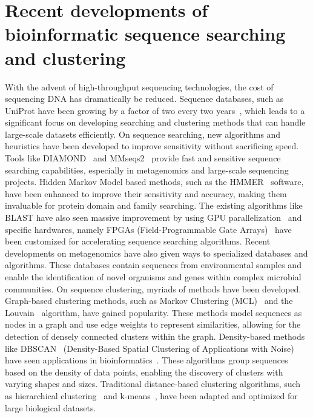 \documentclass[twoside,a4paper,bsc]{master}
\begin{document}
\section{Recent developments of bioinformatic sequence searching and
clustering}
With the advent of high-throughput sequencing technologies, the cost of
sequencing DNA has dramatically be reduced. Sequence databases, such as
UniProt have been growing by a factor of two every two
years~\cite{apweiler2004uniprot}, which leads to a significant focus on
developing searching and clustering methods that can handle large-scale
datasets
efficiently.
On sequence searching, new algorithms and heuristics have been developed to
improve sensitivity without sacrificing speed. Tools like
DIAMOND~\cite{buchfink2015fast,BUC:REU:DRO:2021} and
MMseqs2~\cite{steinegger2017mmseqs2} provide fast and sensitive sequence
searching capabilities,
especially in metagenomics and large-scale sequencing projects.
Hidden
Markov Model based
methods, such as the HMMER~\cite{finn2011hmmer} software, have been
enhanced to improve their
sensitivity and accuracy, making them invaluable for protein domain and
family searching. The existing algorithms like BLAST have also seen massive
improvement by using GPU parallelization~\cite{vouzis2011gpu} and specific
hardwares, namely
FPGAs (Field-Programmable Gate Arrays)~\cite{guo2012systolic} have been
customized for
accelerating sequence searching algorithms.
Recent developments on metagenomics have also given ways to specialized
databases and algorithms. These databases contain sequences from
environmental samples and enable the identification of novel organisms and
genes within complex microbial communities.
On sequence clustering, myriads of methods have been developed. Graph-based
clustering methods, such as Markov Clustering
(MCL)~\cite{shih2012identifying} and the
Louvain~\cite{rahiminejad2019topological} algorithm,
have gained popularity. These methods model sequences as nodes in a graph
and use edge weights to represent similarities, allowing for the detection
of densely connected clusters within the graph. Density-based methods like
DBSCAN~\cite{ester1996density} (Density-Based Spatial Clustering of
Applications with Noise) have
seen applications in bioinformatics~\cite{karim2021deep}. These algorithms
group sequences based on
the density of data points, enabling the discovery of clusters with varying
shapes and sizes. Traditional distance-based clustering algorithms, such as
hierarchical clustering~\cite{lafond2017new} and
k-means~\cite{hussain2011fpga}, have been adapted and optimized for
large biological datasets.
\end{document}
